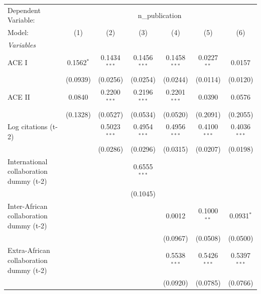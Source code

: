 
\begingroup
\centering
\begin{tabular}{lcccccc}
   \tabularnewline \midrule \midrule
   Dependent Variable: & \multicolumn{6}{c}{n\_publication}\\
   Model:                                  & (1)          & (2)            & (3)            & (4)            & (5)            & (6)\\  
   \midrule
   \emph{Variables}\\
   ACE I                                   & 0.1562$^{*}$ & 0.1434$^{***}$ & 0.1456$^{***}$ & 0.1458$^{***}$ & 0.0227$^{**}$  & 0.0157\\   
                                           & (0.0939)     & (0.0256)       & (0.0254)       & (0.0244)       & (0.0114)       & (0.0120)\\   
   ACE II                                  & 0.0840       & 0.2200$^{***}$ & 0.2196$^{***}$ & 0.2201$^{***}$ & 0.0390         & 0.0576\\   
                                           & (0.1328)     & (0.0527)       & (0.0534)       & (0.0520)       & (0.2091)       & (0.2055)\\   
   Log citations (t-2)                     &              & 0.5023$^{***}$ & 0.4954$^{***}$ & 0.4956$^{***}$ & 0.4100$^{***}$ & 0.4036$^{***}$\\   
                                           &              & (0.0286)       & (0.0296)       & (0.0315)       & (0.0207)       & (0.0198)\\   
   International collaboration dummy (t-2) &              &                & 0.6555$^{***}$ &                &                &   \\   
                                           &              &                & (0.1045)       &                &                &   \\   
   Inter-African collaboration dummy (t-2) &              &                &                & 0.0012         & 0.1000$^{**}$  & 0.0931$^{*}$\\   
                                           &              &                &                & (0.0967)       & (0.0508)       & (0.0500)\\   
   Extra-African collaboration dummy (t-2) &              &                &                & 0.5538$^{***}$ & 0.5426$^{***}$ & 0.5397$^{***}$\\   
                                           &              &                &                & (0.0920)       & (0.0785)       & (0.0766)\\   

\end{tabular}
